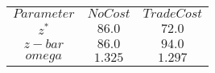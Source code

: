 \begin{tabular}{ccc}
$Parameter$ & $NoCost$ & $TradeCost$\\
$z^*$ & $86.0$ & $72.0$\\
$z-bar$ & $86.0$ & $94.0$\\
$omega$ & $1.325$ & $1.297$\\
\end{tabular}
